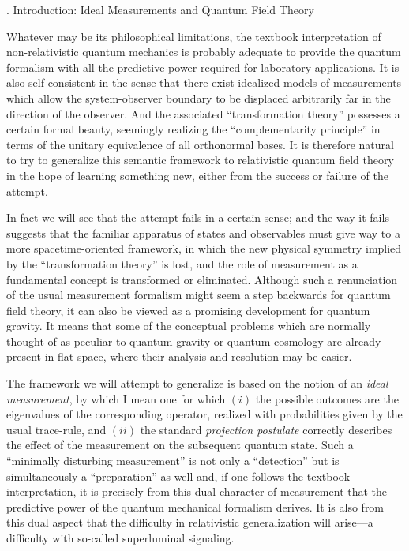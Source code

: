 . Introduction: Ideal Measurements and Quantum Field Theory\par

\tx
Whatever may be its philosophical limitations, the textbook
interpretation of non-relativistic quantum mechanics is probably
adequate to provide the quantum formalism with all the predictive
power required for laboratory applications.  It is also
self-consistent in the sense that there exist idealized models of
measurements which allow the system-observer boundary to be displaced
arbitrarily far in the direction of the observer.  And the associated
``transformation theory'' possesses a certain formal beauty, seemingly
realizing the ``complementarity principle'' in terms of the unitary
equivalence of all orthonormal bases.  It is therefore natural to try
to generalize this semantic framework to relativistic quantum
field theory in the hope of learning something new, either from the
success or failure of the attempt.


\tx
In fact we will see that the attempt fails in a certain
sense; and the way it fails suggests that the familiar apparatus of
states and observables must give way to a more spacetime-oriented
framework, in which
the new physical symmetry implied by
the ``transformation theory'' is lost,
and the role of measurement as a fundamental concept is transformed or
eliminated.  Although such a renunciation of the usual measurement
formalism might seem a step backwards for quantum field theory, it can
also be viewed as a promising development for quantum gravity.  It
means that some of the conceptual problems which are normally thought
of as peculiar to quantum gravity or quantum cosmology are already
present in flat space, where their analysis and resolution may be
easier.


\tx
The framework we will attempt to generalize is based on the notion of
an {\it ideal measurement}, by which I mean one for which $(i)$ the
possible outcomes are the eigenvalues of the corresponding operator,
realized with probabilities given by the usual trace-rule, and $(ii)$
the standard {\it projection postulate} correctly describes the effect
of the measurement on the subsequent quantum state.  Such a
``minimally disturbing measurement'' is not only a ``detection'' but
is simultaneously a ``preparation'' as well and, if one follows the
textbook interpretation, it is precisely from this dual character of
measurement that the predictive power of the quantum mechanical
formalism derives.  It is also from this dual aspect that the
difficulty in relativistic generalization will arise---a difficulty
with so-called superluminal signaling.


